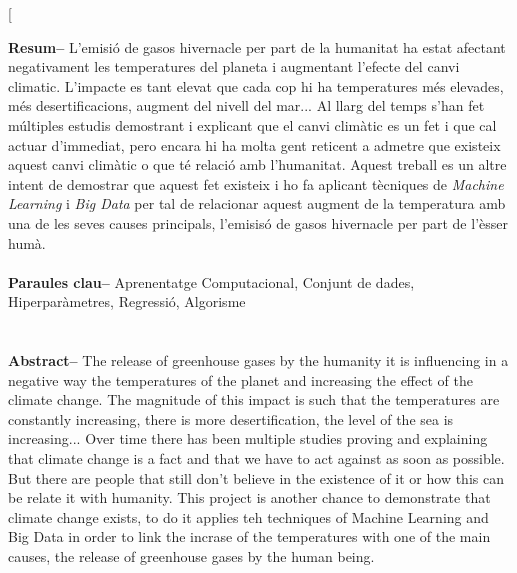 \documentclass[10pt,a4paper,twocolumn,twoside]{article}
\begin{document}
\twocolumn[\begin{@twocolumnfalse}


\maketitle

\thispagestyle{primerapagina}
\begin{center}
\parbox{0.915\textwidth}
{\sffamily
\textbf{Resum--}
L'emisió de gasos hivernacle per part de la humanitat ha estat afectant negativament les temperatures del planeta i augmentant l'efecte del canvi climatic. L'impacte es tant elevat que cada cop hi ha temperatures més elevades, més desertificacions, augment del nivell del mar... Al llarg del temps s'han fet múltiples estudis demostrant i explicant que el canvi climàtic es un fet i que cal actuar d'immediat, pero encara hi ha molta gent reticent a admetre que existeix aquest canvi climàtic o que té relació amb l'humanitat. Aquest treball es un altre intent de demostrar que aquest fet existeix i ho fa aplicant tècniques de \textit{Machine Learning} i \textit{Big Data} per tal de relacionar aquest augment de la temperatura amb una de les seves causes principals, l'emisisó de gasos hivernacle per part de l'èsser humà.
\\
\\
\textbf{Paraules clau-- } Aprenentatge Computacional, Conjunt de dades, Hiperparàmetres, Regressió, Algorisme \\
\\
\bigskip
\\
\textbf{Abstract--} The release of greenhouse gases by the humanity it is influencing in a negative way the temperatures of the planet and increasing the effect of the climate change. The magnitude of this impact is such that the temperatures are constantly increasing, there is more desertification, the level of the sea is increasing... Over time there has been multiple studies proving and explaining that climate change is a fact and that we have to act against as soon as possible. But there are people that still don't believe in the existence of it or how this can be relate it with humanity. This project is another chance to demonstrate that climate change exists, to do it applies teh techniques of Machine Learning and Big Data in order to link the incrase of the temperatures with one of the main causes, the release of greenhouse gases by the human being.
}
\end{center}
\end{@twocolumnfalse}
\end{document}
